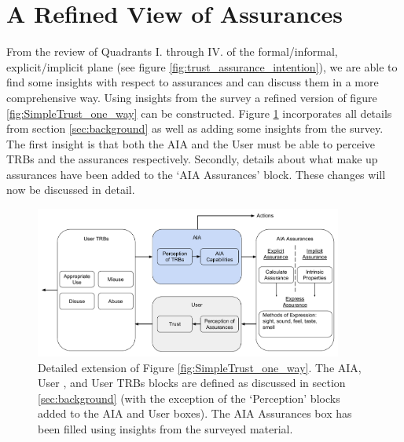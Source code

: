 \section{A Refined View of Assurances} \label{sec:synthesis}
    From the review of Quadrants I. through IV. of the formal/informal, explicit/implicit plane (see figure \ref{fig:trust_assurance_intention}), we are able to find some insights with respect to assurances and can discuss them in a more comprehensive way. Using insights from the survey a refined version of figure \ref{fig:SimpleTrust_one_way} can be constructed. Figure \ref{fig:refined_assurances} incorporates all details from section \ref{sec:background} as well as adding some insights from the survey. The first insight is that both the AIA and the User must be able to perceive TRBs and the assurances respectively. Secondly, details about what make up assurances have been added to the `AIA Assurances' block. These changes will now be discussed in detail.

    \begin{figure}[htbp]
        \centering
        \includegraphics[width=0.9\textwidth]{Figures/RefinedTrust_one_way}
        \caption{Detailed extension of Figure \ref{fig:SimpleTrust_one_way}. The AIA, User , and User TRBs blocks are defined as discussed in section \ref{sec:background} (with the exception of the `Perception' blocks added to the AIA and User boxes). The AIA Assurances box has been filled using insights from the surveyed material.}
        \label{fig:refined_assurances}
    \end{figure}

